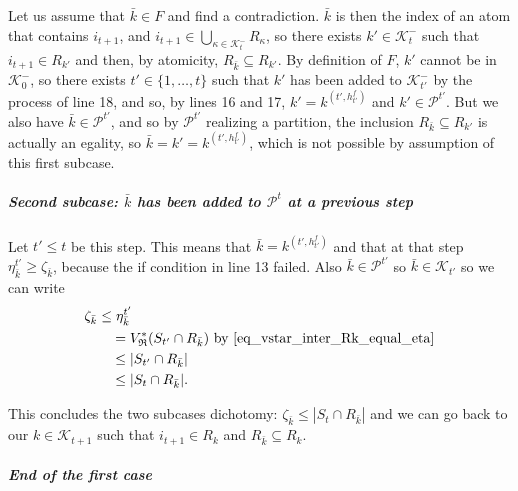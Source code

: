\documentclass[
  11pt,
  a4paper,
]{article}
\let\oldsubparagraph\subparagraph
\renewcommand{\subparagraph}[1]{\oldsubparagraph{#1}\mbox{}}
\theoremstyle{plain}
\theoremstyle{definition}
\theoremstyle{plain}
\theoremstyle{definition}
\theoremstyle{plain}
\theoremstyle{remark}
\begin{document}
Let us assume that \(\bar k\in F\) and find a contradiction. \(\bar k\)
is then the index of an atom that contains \(i_{t+1}\), and
\(i_{t+1}\in\bigcup_{\kappa\in\mathcal{K}^-_{t}}R_{\kappa}\), so there
exists \(k'\in\mathcal{K}^-_{t}\) such that \(i_{t+1}\in R_{k'}\) and
then, by atomicity, \(R_{\bar k}\subseteq R_{k'}\). By definition of
\(F\), \(k'\) cannot be in \(\mathcal{K}_0^-\), so there exists
\(t'\in\{1,\dotsc,t\}\) such that \(k'\) has been added to
\(\mathcal{K}^-_{t'}\) by the process of line 18, and so, by lines 16
and 17, \(k'=k^{(t',h^f_{t'})}\) and \(k'\in\mathcal{P}^{t'}\). But we
also have \(\bar k\in\mathcal{P}^{t'}\), and so by \(\mathcal{P}^{t'}\)
realizing a partition, the inclusion \(R_{\bar k}\subseteq R_{k'}\) is
actually an egality, so \(\bar k = k' = k^{(t',h^f_{t'})}\), which is
not possible by assumption of this first subcase.

\subparagraph{\texorpdfstring{Second subcase: \(\bar k\) has been added
to \(\mathcal{P}^t\) at a previous
step}{Second subcase: \textbackslash bar k has been added to \textbackslash mathcal\{P\}\^{}t at a previous step}}\label{second-subcase-bar-k-has-been-added-to-mathcalpt-at-a-previous-step}

Let \(t'\leq t\) be this step. This means that
\(\bar k = k^{(t',h^f_{t'})}\) and that at that step
\(\eta^{t'}_{\bar k}\geq \zeta_{\bar k}\), because the if condition in
line 13 failed. Also \(\bar k\in \mathcal{P}^{t'}\) so
\(\bar k\in \mathcal{K}_{t'}\) so we can write \begin{align*}
\zeta_{\bar k}&\leq\eta^{t'}_{\bar k}\\
&\quad=V^*_{\mathfrak{R}}(S_{t'}\cap R_{\bar k})  \text{ by~\eqref{eq_vstar_inter_Rk_equal_eta}} \\
&\quad\leq | S_{t'}\cap R_{\bar k} |\\
&\quad\leq  | S_{t}\cap R_{\bar k} |.\\
\end{align*}

This concludes the two subcases dichotomy:
\(\zeta_{\bar k}\leq |S_t\cap R_{\bar k}|\) and we can go back to our
\(k\in\mathcal{K}_{t+1}\) such that \(i_{t+1}\in R_k\) and
\(R_{\bar k}\subseteq R_k\).

\subparagraph{End of the first case}\label{end-of-the-first-case}
\end{document}
